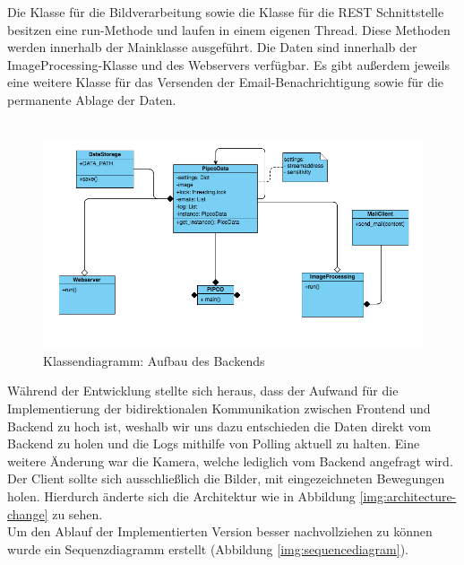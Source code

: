 Die Klasse für die Bildverarbeitung sowie die Klasse für die REST Schnittstelle besitzen eine run-Methode und laufen in einem eigenen Thread. Diese Methoden werden innerhalb der Mainklasse ausgeführt. Die Daten sind innerhalb der ImageProcessing-Klasse und des Webservers verfügbar. Es gibt außerdem jeweils eine weitere Klasse für das Versenden der Email-Benachrichtigung sowie für die permanente Ablage der Daten.\\\\
\begin{figure}[]
	\centering
	\includegraphics[width=\textwidth]{content/pictures/classdiagramm.png}
	\caption{Klassendiagramm: Aufbau des Backends}
	\label{img:backend-classdiagramm}
\end{figure}

Während der Entwicklung stellte sich heraus, dass der Aufwand für die Implementierung der bidirektionalen Kommunikation zwischen Frontend und Backend zu hoch ist, weshalb wir uns dazu entschieden die Daten direkt vom Backend zu holen und die Logs mithilfe von Polling aktuell zu halten.
Eine weitere Änderung war die Kamera, welche lediglich vom Backend angefragt wird. Der Client sollte sich ausschließlich die Bilder, mit eingezeichneten Bewegungen holen.
Hierdurch änderte sich die Architektur wie in Abbildung \ref{img:architecture-change} zu sehen.\\

Um den Ablauf der Implementierten Version besser nachvollziehen zu können wurde ein Sequenzdiagramm erstellt (Abbildung \ref{img:sequencediagram}).

